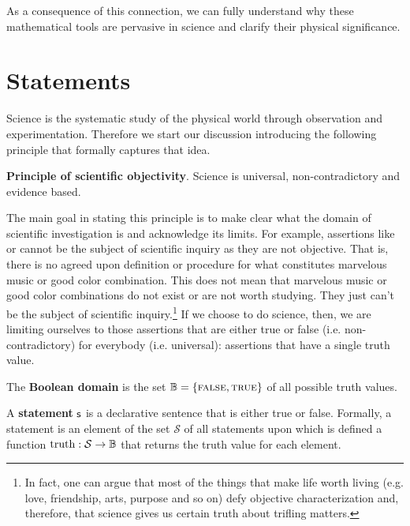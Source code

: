 \documentclass[11pt,letterpaper,fleqn]{memoir} %
\begin{document}
As a consequence of this connection, we can fully understand why these mathematical tools are pervasive in science and clarify their physical significance.

\section{Statements}

Science is the systematic study of the physical world through observation and experimentation. Therefore we start our discussion introducing the following principle that formally captures that idea.

\begin{mathSection}
	\textbf{Principle of scientific objectivity}.
		Science is universal, non-contradictory and evidence based.
\end{mathSection}

The main goal in stating this principle is to make clear what the domain of scientific investigation is and acknowledge its limits. For example, assertions like  or  cannot be the subject of scientific inquiry as they are not objective. That is, there is no agreed upon definition or procedure for what constitutes marvelous music or good color combination. This does not mean that marvelous music or good color combinations do not exist or are not worth studying. They just can't be the subject of scientific inquiry.\footnote{In fact, one can argue that most of the things that make life worth living (e.g. love, friendship, arts, purpose and so on) defy objective characterization and, therefore, that science gives us certain truth about trifling matters.} If we choose to do science, then, we are limiting ourselves to those assertions that are either true or false (i.e. non-contradictory) for everybody (i.e. universal): assertions that have a single truth value.

\begin{mathSection}
\begin{defn}
	The \textbf{Boolean domain} is the set $\mathbb{B} = \{\textsc{false}, \textsc{true}\}$ of all possible truth values.
\end{defn}


\begin{axiom}\label{def_statement}
	A \textbf{statement} $\mathsf{s}$ is a declarative sentence that is either true or false. Formally, a statement is an element of the set $\mathcal{S}$ of all statements upon which is defined a function $\operatorname{truth}: \mathcal{S} \to \mathbb{B}$ that returns the truth value for each element.
\end{axiom}

\end{mathSection}
\end{document}
